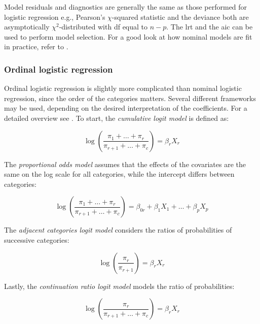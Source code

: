 \documentclass{report}
\begin{document}
Model residuals and diagnostics are generally the same as those performed for logistic regression e.g., Pearson's $\chi$-squared statistic and the deviance both are asymptotically $\chi^2$-distributed with \gls{df} equal to $n - p$. The \gls{lrt} and the \gls{aic} can be used to perform model selection. For a good look at how nominal models are fit in practice, refer to \cite[Chapter~6.1.3]{agresti_foundations_2015}. 

\subsubsection{Ordinal logistic regression}

Ordinal logistic regression is slightly more complicated than nominal logistic regression, since the order of the categories matters. Several different frameworks may be used, depending on the desired interpretation of the coefficients. For a detailed overview see \cite[Chapter~8.4]{dobson_introduction_2018}. To start, the \textit{cumulative logit model} is defined as:

\begin{equation}\label{eq:glm-ordinal-cumulative-logit}
    \log\left(\frac{\pi_1 + \dots + \pi_r}{\pi_{r+1} + \dots + \pi_c}\right) = \beta_r X_r
\end{equation}

The \textit{proportional odds model} assumes that the effects of the covariates are the same on the log scale for all categories, while the intercept differs between categories:

\begin{equation}\label{eq:glm-ordinal-prop-odds}
    \log\left(\frac{\pi_1 + \dots + \pi_r}{\pi_{r+1} + \dots + \pi_c}\right) = \beta_{0r} + \beta_1 X_1 + \dots + \beta_p X_p
\end{equation}

The \textit{adjacent categories logit model} considers the ratios of probabilities of successive categories:

\begin{equation}\label{eq:glm-ordinal-adjacent-categories}
    \log\left(\frac{\pi_r}{\pi_{r+1}}\right) = \beta_r X_r
\end{equation}

Lastly, the \textit{continuation ratio logit model} models the ratio of probabilities:

\begin{equation}\label{eq:glm-ordinal-continuation-ratio}
    \log\left(\frac{\pi_r}{\pi_{r+1} + \dots + \pi_c}\right) = \beta_r X_r
\end{equation}
\end{document}
